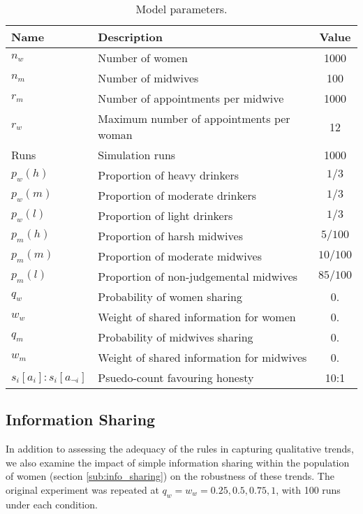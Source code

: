 \begin{table}[h!]
\center
\begin{tabular} {|l | l | c|}
\hline
Name & Description & Value \\ \hline
\(n_{w}\) & Number of women & 1000 \\ \hline
\(n_{m}\) & Number of midwives & 100 \\ \hline
\(r_{m}\) & Number of appointments per midwive & 1000 \\ \hline
\(r_{w}\) & Maximum number of appointments per woman & 12 \\ \hline
Runs & Simulation runs & 1000 \\ \hline
\(p_{w}(h)\) & Proportion of heavy drinkers & \(1/3\) \\ \hline
\(p_{w}(m)\) & Proportion of moderate drinkers & \(1/3\) \\ \hline
\(p_{w}(l)\) & Proportion of light drinkers & \(1/3\) \\ \hline
\(p_{m}(h)\) & Proportion of harsh midwives & \(5/100\) \\ \hline
\(p_{m}(m)\) & Proportion of moderate midwives & \(10/100\) \\ \hline
\(p_{m}(l)\) & Proportion of non-judgemental midwives & \(85/100\) \\ \hline
\(q_{w}\) & Probability of women sharing & 0. \\ \hline
\(w_{w}\) & Weight of shared information for women & 0. \\ \hline
\(q_{m}\) & Probability of midwives sharing & 0. \\ \hline
\(w_{m}\) & Weight of shared information for midwives & 0. \\ \hline
\(s_{i}[a_{i}]:s_{i}[a_{\neg i}]\) & Psuedo-count favouring honesty & 10:1 \\ \hline
\end{tabular}
\caption[Table caption text]{Model parameters. \label{tab:qt_params}}
\end{table}

\subsection{Information Sharing}

In addition to assessing the adequacy of the rules in capturing qualitative trends, we also examine the impact of simple information sharing within the population of women (section \ref{sub:info_sharing}) on the robustness of these trends. The original experiment was repeated at \(q_{w}=w_{w}={0.25, 0.5, 0.75, 1}\), with 100 runs under each condition. 

